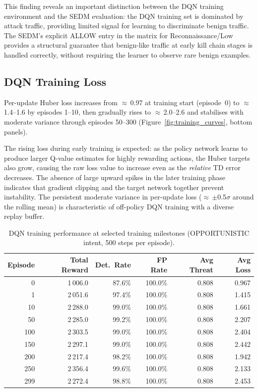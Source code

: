 This finding reveals an important distinction between the DQN training
environment and the SEDM evaluation: the DQN training set is dominated
by attack traffic, providing limited signal for learning to discriminate
benign traffic.
The SEDM's explicit ALLOW entry in the matrix for Reconnaissance/Low
provides a structural guarantee that benign-like traffic at early kill
chain stages is handled correctly, without requiring the learner to observe
rare benign examples.

\subsection{DQN Training Loss}

Per-update Huber loss increases from $\approx$\,0.97 at training start
(episode~0) to $\approx$\,1.4--1.6 by episodes 1--10, then gradually
rises to $\approx$\,2.0--2.6 and stabilises with moderate variance through
episodes 50--300 (Figure~\ref{fig:training_curves}, bottom panels).

The rising loss during early training is expected: as the policy network
learns to produce larger Q-value estimates for highly rewarding actions, the
Huber targets also grow, causing the raw loss value to increase even as the
\emph{relative} TD error decreases.
The absence of large upward spikes in the later training phase indicates
that gradient clipping and the target network together prevent instability.
The persistent moderate variance in per-update loss ($\approx$\,$\pm$0.5$\sigma$
around the rolling mean) is characteristic of off-policy DQN training with a
diverse replay buffer.

\begin{table}[ht]
  \centering
  \caption{DQN training performance at selected training milestones
           (OPPORTUNISTIC intent, 500 steps per episode).}
  \label{tab:dqn_milestones}
  \begin{tabular}{rrrrrr}
    \toprule
    Episode & Total Reward & Det.\ Rate & FP Rate & Avg Threat & Avg Loss \\
    \midrule
    0   & 1\,006.0 & 87.6\% & 100.0\% & 0.808 & 0.967 \\
    1   & 2\,051.6 & 97.4\% & 100.0\% & 0.808 & 1.415 \\
    10  & 2\,288.0 & 99.0\% & 100.0\% & 0.808 & 1.661 \\
    50  & 2\,285.0 & 99.2\% & 100.0\% & 0.808 & 2.207 \\
    100 & 2\,303.5 & 99.0\% & 100.0\% & 0.808 & 2.404 \\
    150 & 2\,297.1 & 99.0\% & 100.0\% & 0.808 & 2.442 \\
    200 & 2\,217.4 & 98.2\% & 100.0\% & 0.808 & 1.942 \\
    250 & 2\,356.4 & 99.6\% & 100.0\% & 0.808 & 2.133 \\
    299 & 2\,272.4 & 98.8\% & 100.0\% & 0.808 & 2.453 \\
    \bottomrule
  \end{tabular}
\end{table}

